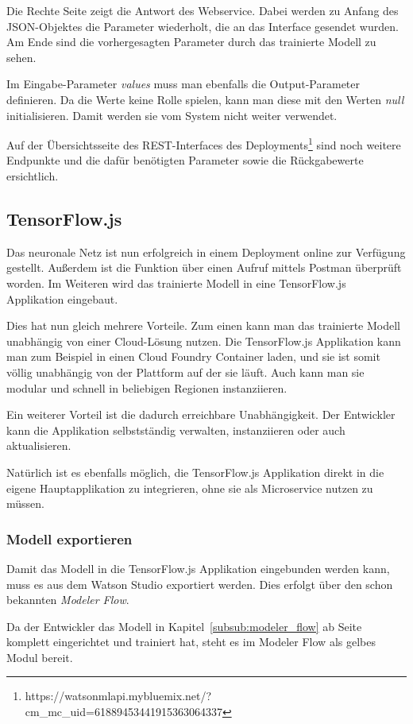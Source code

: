 Die Rechte Seite zeigt die Antwort des Webservice. Dabei werden zu Anfang des JSON-Objektes die Parameter wiederholt,
die an das Interface gesendet wurden. Am Ende sind die vorhergesagten Parameter durch das trainierte Modell zu sehen.

Im Eingabe-Parameter \textit{values} muss man ebenfalls die Output-Parameter definieren. Da die Werte keine Rolle
spielen, kann man diese mit den Werten \textit{null} initialisieren. Damit werden sie vom System nicht weiter verwendet.

Auf der Übersichtsseite des REST-Interfaces des
Deployments\footnote{https://watson\-ml\-api.mybluemix.net/?cm\_mc\_uid=61889453441915363064337} sind noch weitere
Endpunkte und die dafür benötigten Parameter sowie die Rückgabewerte ersichtlich.

\subsection{TensorFlow.js}
Das neuronale Netz ist nun erfolgreich in einem Deployment online zur Verfügung gestellt. Außerdem ist die Funktion
über einen Aufruf mittels Postman überprüft worden. Im Weiteren wird das trainierte Modell in eine TensorFlow.js
Applikation eingebaut.

Dies hat nun gleich mehrere Vorteile. Zum einen kann man das trainierte Modell unabhängig von einer Cloud-Lösung nutzen.
Die TensorFlow.js Applikation kann man zum Beispiel in einen Cloud Foundry Container laden, und sie ist somit völlig
unabhängig von der Plattform auf der sie läuft. Auch kann man sie modular und schnell in beliebigen Regionen
instanziieren.

Ein weiterer Vorteil ist die dadurch erreichbare Unabhängigkeit. Der Entwickler kann die Applikation selbstständig
verwalten, instanziieren oder auch aktualisieren.

Natürlich ist es ebenfalls möglich, die TensorFlow.js Applikation direkt in die eigene Hauptapplikation zu integrieren,
ohne sie als Microservice nutzen zu müssen.

\subsubsection{Modell exportieren}
Damit das Modell in die TensorFlow.js Applikation eingebunden werden kann, muss es aus dem Watson Studio exportiert
werden. Dies erfolgt über den schon bekannten \textit{Modeler Flow}.

Da der Entwickler das Modell in Kapitel~\ref{subsub:modeler_flow} ab Seite~\pageref{subsub:modeler_flow} komplett
eingerichtet und trainiert hat, steht es im Modeler Flow als gelbes Modul bereit.

